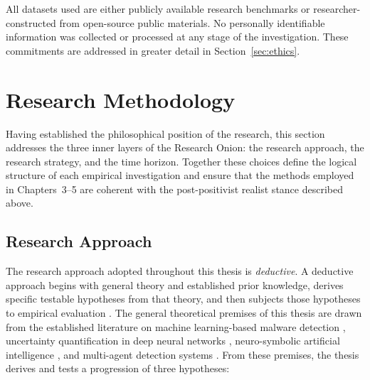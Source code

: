 All datasets used are either publicly available research benchmarks or researcher-constructed
from open-source public materials.
No personally identifiable information was collected or processed at any stage of the investigation.
These commitments are addressed in greater detail in Section~\ref{sec:ethics}.

\section{Research Methodology}
\label{sec:methodology}

Having established the philosophical position of the research, this section addresses the three
inner layers of the Research Onion: the research approach, the research strategy, and the time
horizon.
Together these choices define the logical structure of each empirical investigation and ensure
that the methods employed in Chapters~3--5 are coherent with the post-positivist realist stance
described above.

\subsection{Research Approach}
\label{sec:approach}

The research approach adopted throughout this thesis is \emph{deductive}.
A deductive approach begins with general theory and established prior knowledge, derives specific
testable hypotheses from that theory, and then subjects those hypotheses to empirical
evaluation \cite{saunders2019research}.
The general theoretical premises of this thesis are drawn from the established literature on
machine learning-based malware detection \cite{razaulla2023age, gibert2020rise}, uncertainty
quantification in deep neural networks \cite{gal2016dropout, gawlikowski2023Uncertainity},
neuro-symbolic artificial intelligence \cite{Besold2021neurosymbolicsurvey}, and multi-agent
detection systems \cite{MultiAgentAdaptiveDetection2023}.
From these premises, the thesis derives and tests a progression of three hypotheses:

